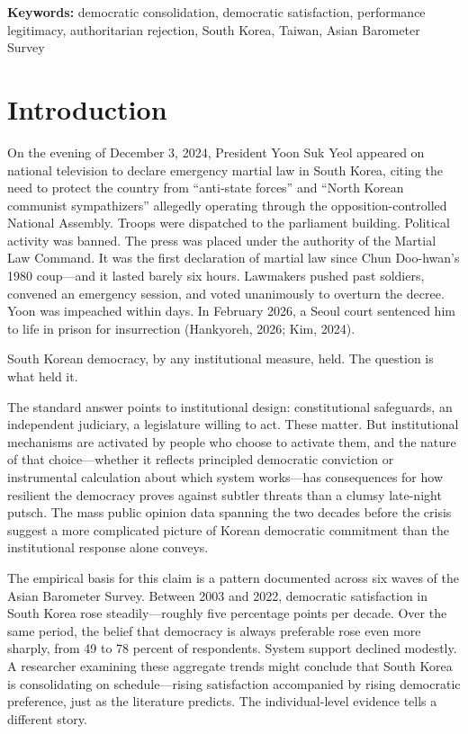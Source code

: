 \documentclass[
  12pt,
  12pt,
  letterpaper]{article}
\begin{document}
\textbf{Keywords:} democratic consolidation, democratic satisfaction,
performance legitimacy, authoritarian rejection, South Korea, Taiwan,
Asian Barometer Survey


\section{Introduction}\label{introduction}

On the evening of December 3, 2024, President Yoon Suk Yeol appeared on
national television to declare emergency martial law in South Korea,
citing the need to protect the country from ``anti-state forces'' and
``North Korean communist sympathizers'' allegedly operating through the
opposition-controlled National Assembly. Troops were dispatched to the
parliament building. Political activity was banned. The press was placed
under the authority of the Martial Law Command. It was the first
declaration of martial law since Chun Doo-hwan's 1980 coup---and it
lasted barely six hours. Lawmakers pushed past soldiers, convened an
emergency session, and voted unanimously to overturn the decree. Yoon
was impeached within days. In February 2026, a Seoul court sentenced him
to life in prison for insurrection (Hankyoreh, 2026; Kim, 2024).

South Korean democracy, by any institutional measure, held. The question
is what held it.

The standard answer points to institutional design: constitutional
safeguards, an independent judiciary, a legislature willing to act.
These matter. But institutional mechanisms are activated by people who
choose to activate them, and the nature of that choice---whether it
reflects principled democratic conviction or instrumental calculation
about which system works---has consequences for how resilient the
democracy proves against subtler threats than a clumsy late-night
putsch. The mass public opinion data spanning the two decades before the
crisis suggest a more complicated picture of Korean democratic
commitment than the institutional response alone conveys.

The empirical basis for this claim is a pattern documented across six
waves of the Asian Barometer Survey. Between 2003 and 2022, democratic
satisfaction in South Korea rose steadily---roughly five percentage
points per decade. Over the same period, the belief that democracy is
always preferable rose even more sharply, from 49 to 78 percent of
respondents. System support declined modestly. A researcher examining
these aggregate trends might conclude that South Korea is consolidating
on schedule---rising satisfaction accompanied by rising democratic
preference, just as the literature predicts. The individual-level
evidence tells a different story.
\end{document}
